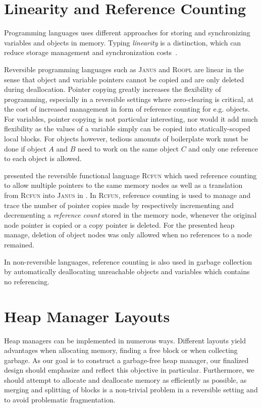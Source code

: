 \section{Linearity and Reference Counting}
\label{sec:referencing}
Programming languages uses different approaches for storing and synchronizing variables and objects in memory. Typing \textit{linearity} is a distinction, which can reduce storage management and synchronization costs~\cite{hb:linearity}.

Reversible programming languages such as \textsc{Janus} and \textsc{Roopl} are linear in the sense that object and variable pointers cannot be copied and are only deleted during deallocation. Pointer copying greatly increases the flexibility of programming, especially in a reversible settings where zero-clearing is critical, at the cost of increased management in form of reference counting for e.g. objects. For variables, pointer copying is not particular interesting, nor would it add much flexibility as the values of a variable simply can be copied into statically-scoped local blocks. For objects however, tedious amounts of boilerplate work must be done if object $A$ and $B$ need to work on the same object $C$ and only one reference to each object is allowed.

\citeauthor{tm:refcounting} presented the reversible functional language \textsc{Rcfun} which used reference counting to allow multiple pointers to the same memory nodes as well as a translation from \textsc{Rcfun} into \textsc{Janus} in \cite{tm:refcounting}. In \textsc{Rcfun}, reference counting is used to manage and trace the number of pointer copies made by respectively incrementing and decrementing a \textit{reference count} stored in the memory node, whenever the original node pointer is copied or a copy pointer is deleted. For the presented heap manage, deletion of object nodes was only allowed when no references to a node remained.

In non-reversible languages, reference counting is also used in garbage collection by automatically deallocating unreachable objects and variables which contains no referencing. 


\section{Heap Manager Layouts}
\label{sec:heap-manager-layout}
Heap managers can be implemented in numerous ways. Different layouts yield advantages when allocating memory, finding a free block or when collecting garbage. As our goal is to construct a garbage-free heap manager, our finalized design should emphasize and reflect this objective in particular. Furthermore, we should attempt to allocate and deallocate memory as efficiently as possible, as merging and splitting of blocks is a non-trivial problem in a reversible setting and to avoid problematic fragmentation.


